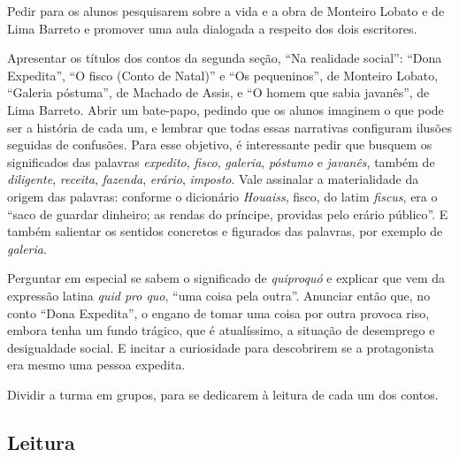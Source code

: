 Pedir para os alunos pesquisarem sobre a vida e a obra de Monteiro
Lobato e de Lima Barreto e promover uma aula dialogada a respeito dos
dois escritores.

Apresentar os títulos dos contos da segunda seção, ``Na realidade
social'': ``Dona Expedita'', ``O fisco (Conto de Natal)'' e ``Os
pequeninos'', de Monteiro Lobato, ``Galeria póstuma'', de Machado de
Assis, e ``O homem que sabia javanês'', de Lima Barreto. Abrir um
bate-papo, pedindo que os alunos imaginem o que pode ser a história de
cada um, e lembrar que todas essas narrativas configuram ilusões
seguidas de confusões. Para esse objetivo, é interessante pedir que
busquem os significados das palavras \emph{expedito}, \emph{fisco},
\emph{galeria}, \emph{póstumo} e \emph{javanês}, também de
\emph{diligente}, \emph{receita}, \emph{fazenda}, \emph{erário},
\emph{imposto}. Vale assinalar a materialidade da origem das palavras:
conforme o dicionário \emph{Houaiss}, fisco, do latim \emph{fiscus}, era
o ``saco de guardar dinheiro; as rendas do príncipe, providas pelo
erário público''. E também salientar os sentidos concretos e figurados
das palavras, por exemplo de \emph{galeria}.

Perguntar em especial se sabem o significado de \emph{quiproquó} e
explicar que vem da expressão latina \emph{quid pro quo}, ``uma coisa
pela outra''. Anunciar então que, no conto ``Dona Expedita'', o engano
de tomar uma coisa por outra provoca riso, embora tenha um fundo
trágico, que é atualíssimo, a situação de desemprego e desigualdade
social. E incitar a curiosidade para descobrirem se a protagonista era
mesmo uma pessoa expedita.

Dividir a turma em grupos, para se dedicarem à leitura de cada um dos
contos.

\subsection{Leitura}

